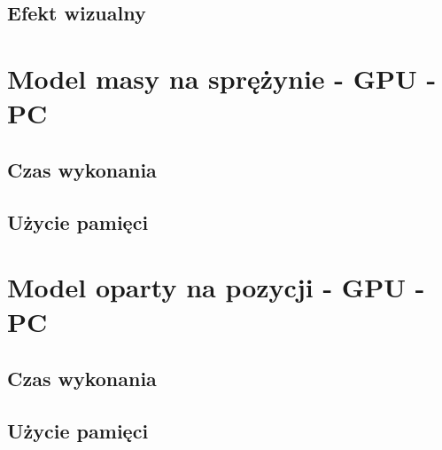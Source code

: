 		\subsection{Efekt wizualny}
		\label{t:wyniki:poz_cpu_andro:wizual}
		
		
	\section{Model masy na sprężynie - GPU - PC}
	\label{t:wyniki:masa_gpu_pc}
	
		\subsection{Czas wykonania}
		\label{t:wyniki:masa_gpu_pc:czas}
		
		\subsection{Użycie pamięci}
		\label{t:wyniki:masa_gpu_pc:pamiec}
		
		
		
	\section{Model oparty na pozycji - GPU - PC}
	\label{t:wyniki:poz_gpu_pc}
	
		\subsection{Czas wykonania}
		\label{t:wyniki:poz_gpu_pc:czas}
		
		\subsection{Użycie pamięci}
		\label{t:wyniki:poz_gpu_pc:pamiec}

